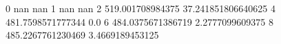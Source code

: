 0 nan nan
1 nan nan
2 519.001708984375 37.241851806640625
4 481.7598571777344 0.0
6 484.0375671386719 2.2777099609375
8 485.2267761230469 3.4669189453125
